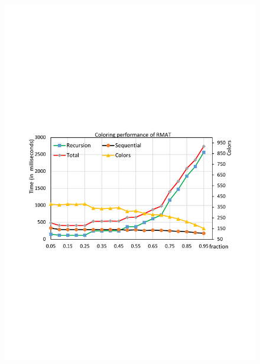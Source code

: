 \begin{figure}[t]
{		\includegraphics[scale=0.2]{figure/exp/rmat.pdf}
	}%
	\subfloat[RandomGraph]{
		\label{fig:random}
}
\end{figure}
